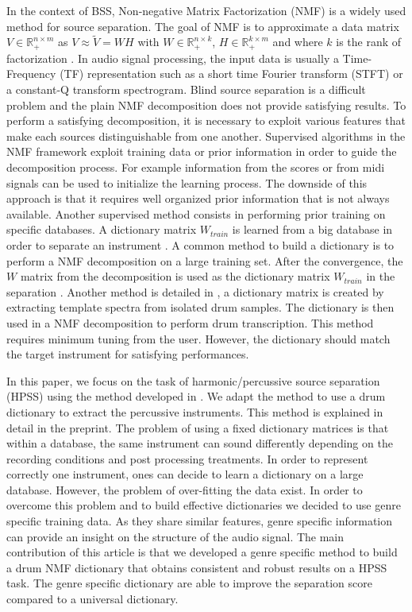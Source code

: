 \documentclass{article}
\begin{document}
In the context of BSS, Non-negative Matrix Factorization (NMF) is a widely used method for source separation. The goal of NMF is to approximate a data matrix $V \in \mathbb{R}_{+}^{n \times m} $ as $V \approx \tilde{V} = WH$ with $W \in \mathbb{R}_{+}^{n \times k}$, $H \in \mathbb{R}_{+}^{k \times m}$ and where $k$ is the rank of factorization \cite{lee99}. In audio signal processing, the input data is usually a Time-Frequency (TF) representation such as a short time Fourier transform (STFT) or a constant-Q transform spectrogram. Blind source separation is a difficult problem and the plain NMF decomposition does not provide satisfying results. To perform a satisfying decomposition, it is necessary to exploit various features that make each sources distinguishable from one another. 
Supervised algorithms in the NMF framework exploit training data or prior information in order to guide the decomposition process. For example information from the scores or from midi signals \cite{EwertM12} can be used to initialize the learning process. The downside of this approach is that it requires well organized prior information that is not always available. Another supervised method consists in performing prior training on specific databases. A dictionary matrix $W_{train}$ is learned from a big database in order to separate an instrument \cite{jaureguiberry2011adaptation,wudrum}. A common method to build a dictionary is to perform a NMF decomposition on a large training set. After the convergence, the $W$ matrix from the decomposition is used as the dictionary matrix $W_{train}$ in the separation \cite{jaureguiberry2011adaptation}. Another method is detailed in \cite{wudrum}, a dictionary matrix is created by extracting template spectra from isolated drum samples. The dictionary is then used in a NMF decomposition to perform drum transcription. This method requires minimum tuning from the user. However, the dictionary should match the target instrument for satisfying performances. 

In this paper, we focus on the task of harmonic/percussive source separation (HPSS) using the method developed in \cite{laroche2015structured}. We adapt the method to use a drum dictionary to extract the percussive instruments. This method is explained in detail in the preprint. 
The problem of using a fixed dictionary matrices is that within a database, the same instrument can sound differently depending on the recording conditions and post processing treatments. In order to represent correctly one instrument, ones can decide to learn a dictionary on a large database. However, the problem of over-fitting the data exist. In order to overcome this problem and to build effective dictionaries we decided to use genre specific training data. As they share similar features, genre specific information can provide an insight on the structure of the audio signal.
The main contribution of this article is that we developed a genre specific method to build a drum NMF dictionary that obtains consistent and robust results on a HPSS task. The genre specific dictionary are able to improve the separation score compared to a universal dictionary. 
 
\end{document}
